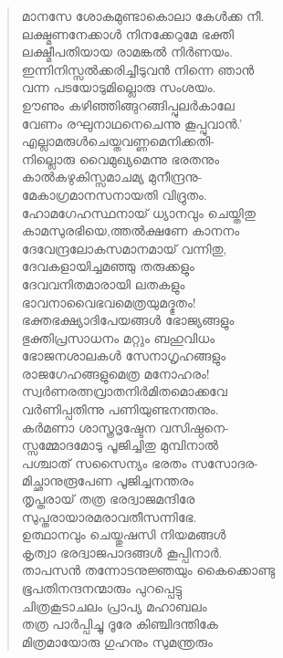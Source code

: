 \begin{verse}
മാനസേ ശോകമുണ്ടാകൊലാ കേള്‍ക്ക നീ.\\
ലക്ഷ്മണനേക്കാള്‍ നിനക്കേറുമേ ഭക്തി\\
ലക്ഷ്മീപതിയായ രാമങ്കല്‍ നിര്‍ണയം.\\
ഇന്നിനിസ്സല്‍ക്കരിച്ചീടുവന്‍ നിന്നെ ഞാന്‍\\
വന്ന പടയോടുമില്ലൊരു സംശയം.\\
ഊണും കഴിഞ്ഞിങ്ങുറങ്ങിപ്പുലര്‍കാലേ\\
വേണം രഘുനാഥനെചെന്നു കൂപ്പുവാന്‍.’\\
എല്ലാമരുള്‍ചെയ്തവണ്ണമെനിക്കതി-\\
നില്ലൊരു വൈമുഖ്യമെന്നു ഭരതനും\\
കാല്‍കഴുകിസ്സമാചമ്യ മുനീന്ദ്രനു-\\
മേകാഗ്രമാനസനായതി വിദ്രുതം.\\
ഹോമഗേഹസ്ഥനായ് ധ്യാനവും ചെയ്തിതു\\
കാമസുരഭിയെ,ത്തല്‍ക്ഷണേ കാനനം\\
ദേവേന്ദ്രലോകസമാനമായ് വന്നിതു,\\
ദേവകളായിച്ചമഞ്ഞു തരുക്കളും\\
ദേവവനിതമാരായി ലതകളും\\
ഭാവനാവൈഭവമെത്രയുമദ്ഭുതം!\\
ഭക്തഭക്ഷ്യാദിപേയങ്ങള്‍ ഭോജ്യങ്ങളും\\
ഭുക്തിപ്രസാധനം മറ്റും ബഹുവിധം\\
ഭോജനശാലകള്‍ സേനാഗൃഹങ്ങളും\\
രാജഗേഹങ്ങളുമെത്ര മനോഹരം!\\
സ്വര്‍ണരത്നവ്രാതനിര്‍മിതമൊക്കവേ\\
വര്‍ണിപ്പതിന്നു പണിയുണ്ടനന്തനും.\\
കര്‍മണാ ശാസ്ത്രദൃഷ്ടേന വസിഷ്ഠനെ-\\
സ്സമ്മോദമോടു പൂജിച്ചിതു മുമ്പിനാല്‍\\
പശ്ചാത് സസൈന്യം ഭരതം സസോദര-\\
മിച്ഛാനുരൂപേണ പൂജിച്ചനന്തരം\\
തൃപ്തരായ് തത്ര ഭരദ്വാജമന്ദിരേ\\
സുപ്തരായാരമരാവതീസന്നിഭേ.\\
ഉത്ഥാനവും ചെയ്തുഷസി നിയമങ്ങള്‍\\
കൃത്വാ ഭരദ്വാജപാദങ്ങള്‍ കൂപ്പിനാര്‍.\\
താപസന്‍ തന്നോടനുജ്ഞയും കൈക്കൊണ്ടു\\
ഭൂപതിനന്ദനന്മാരും പുറപ്പെട്ടു\\
ചിത്രകൂടാചലം പ്രാപ്യ മഹാബലം\\
തത്ര പാര്‍പ്പിച്ചു ദൂരേ കിഞ്ചിദന്തികേ\\
മിത്രമായോരു ഗുഹനും സുമന്ത്രരും\\

\end{verse}
